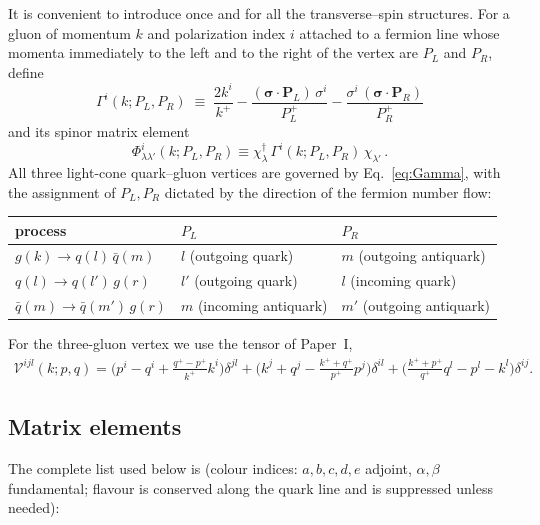\documentclass[11pt]{article}
\newcommand{\dg}{\dagger}
\newcommand{\Phiv}{\Phi}
\newcommand{\Gam}{\Gamma}
\newcommand{\Vggg}{\mathcal{V}}
\begin{document}
It is convenient to introduce once and for all the transverse--spin structures. For a gluon of
momentum $k$ and polarization index $i$ attached to a fermion line whose momenta immediately to
the left and to the right of the vertex are $P_L$ and $P_R$, define
\begin{equation}
\boxed{\;\Gam^i(k;P_L,P_R)\;\equiv\;\frac{2k^i}{k^+}
-\frac{(\bm\sigma\!\cdot\!\bm P_L)\,\sigma^i}{P_L^+}
-\frac{\sigma^i\,(\bm\sigma\!\cdot\!\bm P_R)}{P_R^+}\;}
\label{eq:Gamma}
\end{equation}
and its spinor matrix element
\begin{equation}
\Phiv^i_{\lambda\lambda'}(k;P_L,P_R)\equiv\chi^\dg_\lambda\,\Gam^i(k;P_L,P_R)\,\chi_{\lambda'}\,.
\end{equation}
All three light-cone quark--gluon vertices are governed by Eq.~\eqref{eq:Gamma}, with the
assignment of $P_L,P_R$ dictated by the direction of the fermion number flow:
\begin{center}
\begin{tabular}{lll}
\hline
process & $P_L$ & $P_R$\\
\hline
$g(k)\to q(l)\,\bar q(m)$ & $l$ (outgoing quark) & $m$ (outgoing antiquark)\\
$q(l)\to q(l')\,g(r)$ & $l'$ (outgoing quark) & $l$ (incoming quark)\\
$\bar q(m)\to \bar q(m')\,g(r)$ & $m$ (incoming antiquark) & $m'$ (outgoing antiquark)\\
\hline
\end{tabular}
\end{center}
For the three-gluon vertex we use the tensor of Paper~I,
\begin{align}
\Vggg^{ijl}(k;p,q)=\Big(p^i-q^i+\frac{q^+-p^+}{k^+}k^i\Big)\delta^{jl}
+\Big(k^j+q^j-\frac{k^++q^+}{p^+}p^j\Big)\delta^{il}
+\Big(\frac{k^++p^+}{q^+}q^l-p^l-k^l\Big)\delta^{ij}.
\label{eq:Vggg}
\end{align}

\subsection{Matrix elements}
\label{sec:me}

The complete list used below is (colour indices: $a,b,c,d,e$ adjoint, $\alpha,\beta$ fundamental;
flavour is conserved along the quark line and is suppressed unless needed):
\end{document}
